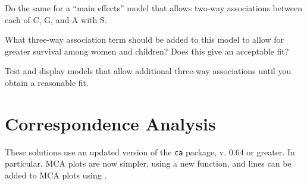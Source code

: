 \documentclass[10pt]{report}\usepackage[]{graphicx}\usepackage[]{color}
\newenvironment{knitrout}{}{} %
\renewenvironment{knitrout}{\small\renewcommand{\baselinestretch}{.85}}{} %
\begin{document}
\begin{Exercises}
\begin{enumerate*}
\begin{ans}
\begin{knitrout}
\end{knitrout}
      \end{ans}
      
      \item Do the same for a ``main effects'' model that allows two-way associations between each of C, G, 
      and A with S.
      \begin{ans}

      \end{ans}
      
      \item What three-way association term should be added to this model to allow for greater survival among women and children?
      Does this give an acceptable fit?
      \begin{ans}
      \end{ans}
      
      \item Test and display models that allow additional three-way associations until you obtain 
      a reasonable fit.
      \begin{ans}
      \end{ans}
      
    \end{enumerate*}
  
\end{Exercises}


\clearpage
\chapter{Correspondence Analysis}\label{ch:corresp}

These solutions use an updated version of the \texttt{ca} package, v. 0.64 or greater. In particular,
MCA plots are now simpler, using a new  function, and lines can be added to
MCA plots using .
\end{document}
